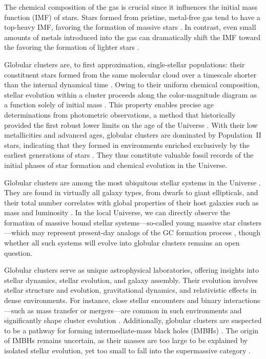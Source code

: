     The chemical composition of the gas is crucial since it influences the initial mass function (IMF) of stars. Stars formed from pristine, metal-free gas tend to have a top-heavy IMF, favoring the formation of massive stars \citep{2002ApJ...571...30S,2006MNRAS.369..825S}. In contrast, even small amounts of metals introduced into the gas can dramatically shift the IMF toward the favoring the formation of lighter stars \citep{2021MNRAS.508.4175C}.

    Globular clusters are, to first approximation, single-stellar populations: their constituent stars formed from the same molecular cloud over a timescale shorter than the internal dynamical time \citep{1988ApJ...324..288A,2009MNRAS.397..954F,2014PhR...539...49K}. Owing to their uniform chemical composition, stellar evolution within a cluster proceeds along the color-magnitude diagram as a function solely of initial mass \citep{2013sse..book.....K}. This property enables precise age determinations from photometric observations, a method that historically provided the first robust lower limits on the age of the Universe \citep{1959MNRAS.119..124H,1970ApJ...162..841S,1985A&A...147..169G,1992ApJ...400..265M}. With their low metallicities and advanced ages, globular clusters are dominated by Population~II stars, indicating that they formed in environments enriched exclusively by the earliest generations of stars \citep{2022A&A...668A.191C}. They thus constitute valuable fossil records of the initial phases of star formation and chemical evolution in the Universe.
    
    Globular clusters are among the most ubiquitous stellar systems in the Universe \citep{2006ARA&A..44..193B,2019ARA&A..57..227K}. They are found in virtually all galaxy types, from dwarfs to giant ellipticals, and their total number correlates with global properties of their host galaxies such as mass and luminosity \citep[e.g.,][]{2013ApJ...772...82H,2018MNRAS.481.5592F}. In the local Universe, we can directly observe the formation of massive bound stellar systems—so-called young massive star clusters—which may represent present-day analogs of the GC formation process \citep[e.g.,][]{2010ARA&A..48..431P,2020SSRv..216...69A}, though whether all such systems will evolve into globular clusters remains an open question.

    Globular clusters serve as unique astrophysical laboratories, offering insights into stellar dynamics, stellar evolution, and galaxy assembly. Their evolution involves stellar structure and evolution, gravitational dynamics, and relativistic effects in dense environments. For instance, close stellar encounters and binary interactions—such as mass transfer or mergers—are common in such environments and significantly shape cluster evolution \citep{2004MNRAS.349..129D,2016MNRAS.458.1450W,2024MNRAS.528.5119A}. Additionally, globular clusters are suspected to be a pathway for forming intermediate-mass black holes (IMBHs) \citep{2013MNRAS.432.2779B,2015MNRAS.454.3150G}. The origin of IMBHs remains uncertain, as their masses are too large to be explained by isolated stellar evolution, yet too small to fall into the supermassive category \citep{2020ARA&A..58..257G}. 
    
